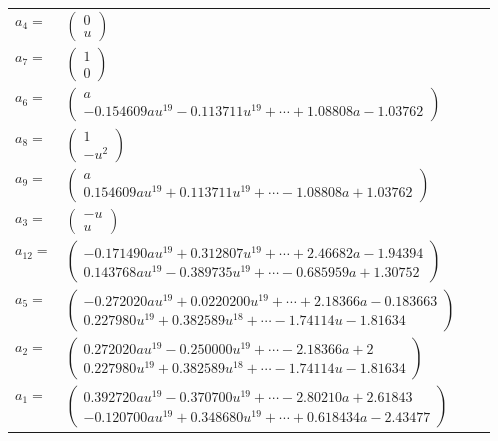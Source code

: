 \documentclass[1p]{elsarticle_modified}
\theoremstyle{definition}
\begin{document}
\begin{tabular}{m{7pt} m{180pt} m{7pt} m{180pt} }
\flushright $a_{4}=$&$\begin{pmatrix}0\\u\end{pmatrix}$ \\
\flushright $a_{7}=$&$\begin{pmatrix}1\\0\end{pmatrix}$ \\
\flushright $a_{6}=$&$\begin{pmatrix}a\\-0.154609 a u^{19}-0.113711 u^{19}+\cdots+1.08808 a-1.03762\end{pmatrix}$ \\
\flushright $a_{8}=$&$\begin{pmatrix}1\\- u^2\end{pmatrix}$ \\
\flushright $a_{9}=$&$\begin{pmatrix}a\\0.154609 a u^{19}+0.113711 u^{19}+\cdots-1.08808 a+1.03762\end{pmatrix}$ \\
\flushright $a_{3}=$&$\begin{pmatrix}- u\\u\end{pmatrix}$ \\
\flushright $a_{12}=$&$\begin{pmatrix}-0.171490 a u^{19}+0.312807 u^{19}+\cdots+2.46682 a-1.94394\\0.143768 a u^{19}-0.389735 u^{19}+\cdots-0.685959 a+1.30752\end{pmatrix}$ \\
\flushright $a_{5}=$&$\begin{pmatrix}-0.272020 a u^{19}+0.0220200 u^{19}+\cdots+2.18366 a-0.183663\\0.227980 u^{19}+0.382589 u^{18}+\cdots-1.74114 u-1.81634\end{pmatrix}$ \\
\flushright $a_{2}=$&$\begin{pmatrix}0.272020 a u^{19}-0.250000 u^{19}+\cdots-2.18366 a+2\\0.227980 u^{19}+0.382589 u^{18}+\cdots-1.74114 u-1.81634\end{pmatrix}$ \\
\flushright $a_{1}=$&$\begin{pmatrix}0.392720 a u^{19}-0.370700 u^{19}+\cdots-2.80210 a+2.61843\\-0.120700 a u^{19}+0.348680 u^{19}+\cdots+0.618434 a-2.43477\end{pmatrix}$ \\

\end{tabular}
\end{document}
